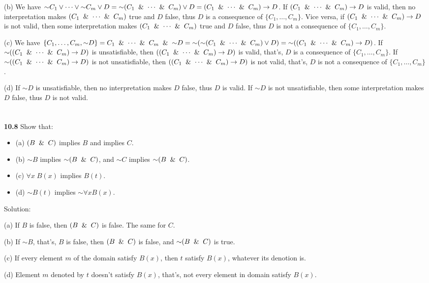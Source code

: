 \documentclass{ctexart}
\newcommand{\unsim}{\mathord{\sim}}
\begin{document}
(b)
We have $\unsim C_1 \lor \dots \lor \unsim C_m \lor D = \unsim (C_1 \And \dots \And C_m) \lor D
= (C_1 \And \dots \And C_m) \to D$.
If $(C_1 \And \dots \And C_m) \to D$ is valid, then no interpretation makes $(C_1 \And \dots \And C_m)$ true
and $D$ false, thus $D$ is a consequence of $\{C_1 , \dots , C_m \}$. Vice versa, if
$(C_1 \And \dots \And C_m) \to D$ is not valid, then some interpretation makes $(C_1 \And \dots \And C_m)$ true
and $D$ false, thus $D$ is not a consequence of $\{C_1 , \dots , C_m \}$.

(c) We have $\{C_1 , \dots , C_m, \unsim D\} = C_1 \And \dots \And C_m \And \unsim D
= \unsim (\unsim (C_1 \And \dots \And C_m) \lor D)
= \unsim ((C_1 \And \dots \And C_m) \to D)
$. If $\unsim ((C_1 \And \dots \And C_m) \to D)$ is unsatisfiable, then $((C_1 \And \dots \And C_m) \to D)$
is valid, that's, $D$ is a consequence of $\{C_1 , \dots , C_m \}$.
If $\unsim ((C_1 \And \dots \And C_m) \to D)$ is not unsatisfiable, then $((C_1 \And \dots \And C_m) \to D)$
is not valid, that's, $D$ is not a consequence of $\{C_1 , \dots , C_m \}$.

(d) If $\unsim D$ is unsatisfiable, then no interpretation makes $D$ false, thus $D$ is valid.
If $\unsim D$ is not unsatisfiable, then some interpretation makes $D$ false, thus $D$ is not valid.

\section*{}
\textbf{10.8}
Show that:
\begin{itemize}
\item (a) $(B \And C)$ implies $B$ and implies $C$.
\item (b) $\unsim B$ implies $\unsim(B \And C)$, and $\unsim C$ implies $\unsim (B \And C)$.
\item (c) $\forall x\; B(x)$ implies $B(t)$.
\item (d) $\unsim B(t)$ implies $\unsim \forall x B(x)$.
\end{itemize}

Solution:

(a) If $B$ is false, then $(B \And C)$ is false. The same for $C$.

(b) If $\unsim B$, that's, $B$ is false, then $(B \And C)$ is false, and $\unsim(B \And C)$ is true.

(c) If every element $m$ of the domain satisfy $B(x)$, then $t$ satisfy $B(x)$, whatever its denotion
is.

(d) Element $m$ denoted by $t$ doesn't satisfy $B(x)$, that's, not every element in domain satisfy $B(x)$.
\end{document}
